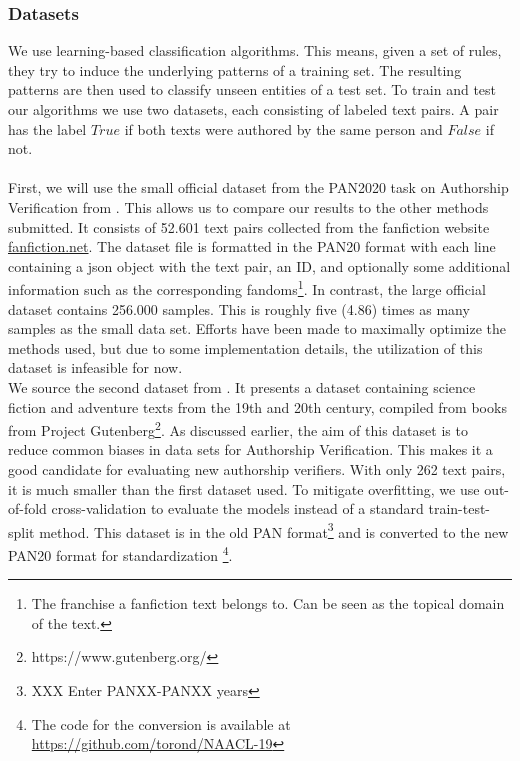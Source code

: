 \subsubsection{Datasets}
We use learning-based classification algorithms.
This means, given a set of rules, they try to induce the underlying patterns of a training set.
The resulting patterns are then used to classify unseen entities of a test set.
To train and test our algorithms we use two datasets, each consisting of labeled text pairs.
A pair has the label $True$ if both texts were authored by the same person and $False$ if not.\\\\
First, we will use the small official dataset from the PAN2020 task on Authorship Verification from \cite{bevendorff2020overview}.
This allows us to compare our results to the other methods submitted.
It consists of 52.601 text pairs collected from the fanfiction website \url{fanfiction.net}.
The dataset file is formatted in the PAN20 format with each line containing a json object with the text pair, an ID, and optionally some additional information such as the corresponding fandoms\footnote{The franchise a fanfiction text belongs to. Can be seen as the topical domain of the text.}.
In contrast, the large official dataset contains 256.000 samples.
This is roughly five (4.86) times as many samples as the small data set.
Efforts have been made to maximally optimize the methods used, but due to some implementation details, the utilization of this dataset is infeasible for now.\\
We source the second dataset from \cite{stein2019unbiasedGutenbergCorpus}.
It presents a dataset containing science fiction and adventure texts from the 19th and 20th century, compiled from books from Project Gutenberg\footnote{https://www.gutenberg.org/}.
As discussed earlier, the aim of this dataset is to reduce common biases in data sets for Authorship Verification.
This makes it a good candidate for evaluating new authorship verifiers.
With only 262 text pairs, it is much smaller than the first dataset used.
To mitigate overfitting, we use out-of-fold cross-validation to evaluate the models instead of a standard train-test-split method.
This dataset is in the old PAN format\footnote{XXX Enter PANXX-PANXX years} and is converted to the new PAN20 format for standardization \footnote{The code for the conversion is available at \url{https://github.com/torond/NAACL-19}}.\\


